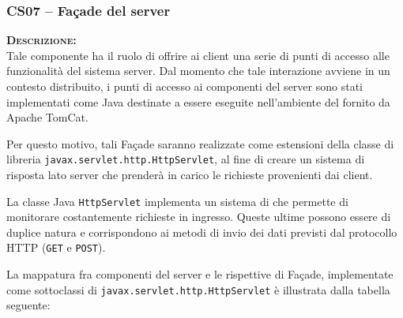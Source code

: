 \subsubsection{CS07 -- Façade del server}\label{sec:cs07}
\begin{description}
	\item{\scshape\bfseries Descrizione:}\\
Tale componente ha il ruolo di offrire ai client una serie di punti di accesso alle funzionalità del sistema server. Dal momento che tale interazione avviene in un contesto distribuito, i punti di accesso ai componenti del server sono stati implementati come  Java destinate a essere eseguite nell'ambiente del  fornito da Apache TomCat.

Per questo motivo, tali Façade saranno realizzate come estensioni della classe di libreria \texttt{javax.servlet.http.HttpServlet}, al fine di creare un sistema di risposta lato server che prenderà in carico le richieste provenienti dai client.

La classe Java \texttt{HttpServlet} implementa un sistema di  che permette di monitorare costantemente richieste in ingresso. Queste ultime possono essere di duplice natura e corrispondono ai metodi di invio dei dati previsti dal protocollo HTTP (\texttt{GET} e \texttt{POST}).

La mappatura fra componenti del server e le rispettive  di Façade, implementate come sottoclassi di \texttt{javax.servlet.http.HttpServlet} è illustrata dalla tabella seguente:


\end{description}
